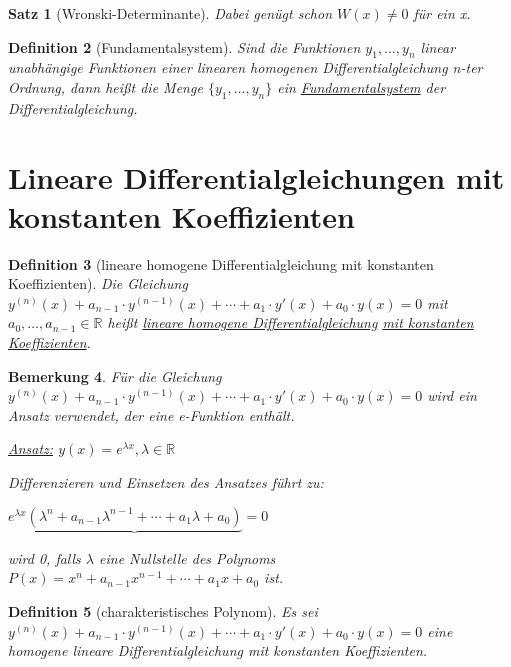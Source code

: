 \documentclass[fontset=ubuntu,11pt,a4paper,fleqn,headsepline]{scrreprt}
\newtheorem{defi}{Definition}[section]
\newtheorem{bemerkung}[defi]{Bemerkung}
\newtheorem{satz}[defi]{Satz}
\begin{document}
\begin{multicols}{2}
\begin{satz}[Wronski-Determinante]
            Dabei genügt schon \(W(x) \ne 0\) für ein x.
        \end{satz}
    
        \begin{defi}[Fundamentalsystem]
            Sind die Funktionen \(y_1,\dots,y_n\) linear unabhängige Funktionen einer linearen homogenen Differentialgleichung n-ter Ordnung, dann heißt die Menge \(\{y_1,\dots,y_n\}\) ein \underline{Fundamentalsystem} der Differentialgleichung.
        \end{defi}
    
        \section*{Lineare Differentialgleichungen mit konstanten Koeffizienten}
    
        \begin{defi}[lineare homogene Differentialgleichung mit konstanten Koeffizienten]
            Die Gleichung \(y^{(n)}(x) + a_{n-1} \cdot y^{(n-1)}(x) + \cdots + a_1 \cdot y'(x) + a_0 \cdot y(x) = 0\) mit \(a_0,\dots,a_{n-1} \in \mathbb{R}\) heißt \underline{lineare homogene Differentialgleichung} \underline{mit konstanten Koeffizienten}.
        \end{defi}
    
        \begin{bemerkung}
            Für die Gleichung
            \(y^{(n)}(x) + a_{n-1} \cdot y^{(n-1)}(x) + \cdots + a_1 \cdot y'(x) + a_0 \cdot y(x) = 0\)
            wird ein Ansatz verwendet, der eine e-Funktion enthält.
    
            \underline{Ansatz:} \(y(x)=e^{\lambda x},\lambda\in\mathbb{R}\)
    
            Differenzieren und Einsetzen des Ansatzes führt zu: 
            
            \(e^{\lambda x}\underbrace{(\lambda^n+a_{n-1}\lambda^{n-1}+\cdots+a_1\lambda+a_0)}=0\)
            
            wird 0, falls \(\lambda\) eine Nullstelle des Polynoms \(P(x)=x^n+a_{n-1}x^{n-1}+\cdots+a_1x+a_0\) ist.
        \end{bemerkung}
    
        \begin{defi}[charakteristisches Polynom]
            Es sei \(y^{(n)}(x) + a_{n-1} \cdot y^{(n-1)}(x) + \cdots + a_1 \cdot y'(x) + a_0 \cdot y(x) = 0\) eine homogene lineare Differentialgleichung mit konstanten Koeffizienten.
    

\end{defi}
\end{multicols}
\end{document}
